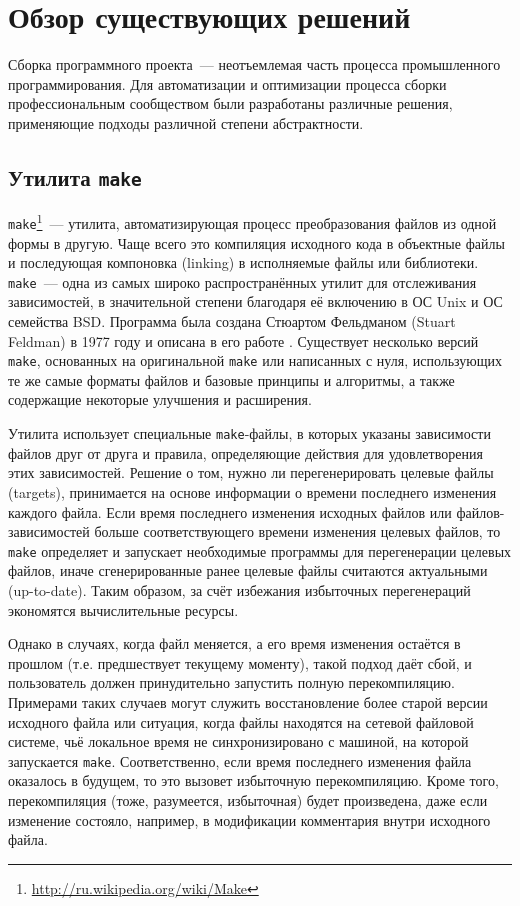 \section{Обзор существующих решений}

Сборка программного проекта~--- неотъемлемая часть процесса промышленного программирования. Для автоматизации и оптимизации процесса сборки профессиональным сообществом были разработаны различные решения, применяющие подходы различной степени абстрактности.

\subsection{Утилита \texttt{make}}
\texttt{make}\footnote{\url{http://ru.wikipedia.org/wiki/Make}}~--- утилита, автоматизирующая процесс преобразования файлов из одной формы в другую. Чаще всего это компиляция исходного кода в объектные файлы и последующая компоновка (linking) в исполняемые файлы или библиотеки. \texttt{make}~--- одна из самых широко распространённых утилит для отслеживания зависимостей, в значительной степени благодаря её включению в ОС Unix и ОС семейства BSD. Программа была создана Стюартом Фельдманом (Stuart Feldman) в 1977 году и описана в его работе \cite{feldman_make}. Существует несколько версий \texttt{make}, основанных на оригинальной \texttt{make} или написанных с нуля, использующих те же самые форматы файлов и базовые принципы и алгоритмы, а также содержащие некоторые улучшения и расширения.

Утилита использует специальные \texttt{make}-файлы, в которых указаны зависимости файлов друг от друга и правила, определяющие действия для удовлетворения этих зависимостей. Решение о том, нужно ли перегенерировать целевые файлы (targets), принимается на основе информации о времени последнего изменения каждого файла. Если время последнего изменения исходных файлов или файлов-зависимостей больше соответствующего времени изменения целевых файлов, то \texttt{make} определяет и запускает необходимые программы для перегенерации целевых файлов, иначе сгенерированные ранее целевые файлы считаются актуальными (up-to-date). Таким образом, за счёт избежания избыточных перегенераций экономятся вычислительные ресурсы.

Однако в случаях, когда файл меняется, а его время изменения остаётся в прошлом (т.е. предшествует текущему моменту), такой подход даёт сбой, и пользователь должен принудительно запустить полную перекомпиляцию. Примерами таких случаев могут служить восстановление более старой версии исходного файла или ситуация, когда файлы находятся на сетевой файловой системе, чьё локальное время не синхронизировано с машиной, на которой запускается \texttt{make}. Соответственно, если время последнего изменения файла оказалось в будущем, то это вызовет избыточную перекомпиляцию. Кроме того, перекомпиляция (тоже, разумеется, избыточная) будет произведена, даже если изменение состояло, например, в модификации комментария внутри исходного файла.

